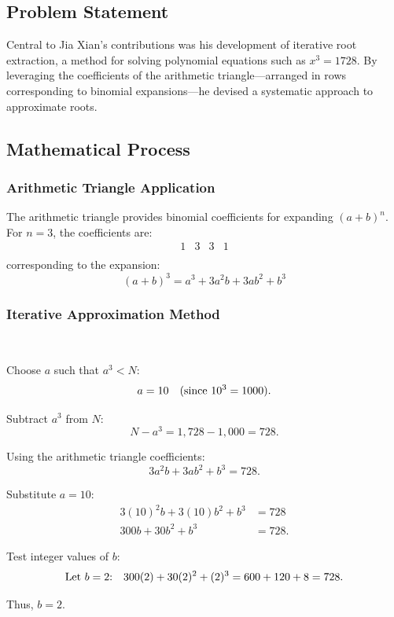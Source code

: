 \documentclass{article}
\begin{document}
\subsection{Problem Statement}
Central to Jia Xian’s contributions was his development of iterative root extraction, a method for solving polynomial equations such as $x^3=1728$. By leveraging the coefficients of the arithmetic triangle—arranged in rows corresponding to binomial expansions—he devised a systematic approach to approximate roots.

\subsection{Mathematical Process}

\subsubsection{Arithmetic Triangle Application}

The arithmetic triangle provides binomial coefficients for expanding \( (a + b)^n \). For \( n = 3 \), the coefficients are:
\[
\begin{array}{cccc}
1 & 3 & 3 & 1 \\
\end{array}
\]
corresponding to the expansion:
\[
(a + b)^3 = a^3 + 3a^2b + 3ab^2 + b^3
\]

\subsubsection{Iterative Approximation Method}

~

Choose \( a \) such that \( a^3 < N \):
\[
a = 10 \quad \text{(since \( 10^3 = 1000 \))}.
\]

Subtract \( a^3 \) from \( N \):
\[
N - a^3 = 1,\!728 - 1,\!000 = 728.
\]

Using the arithmetic triangle coefficients:
\[
3a^2b + 3ab^2 + b^3 = 728.
\]

Substitute \( a = 10 \):
\begin{align*}
3(10)^2b + 3(10)b^2 + b^3 &= 728 \\
300b + 30b^2 + b^3 &= 728.
\end{align*}

Test integer values of \( b \):
\[
\text{Let \( b = 2 \):} \quad 300(2) + 30(2)^2 + (2)^3 = 600 + 120 + 8 = 728.
\]

Thus, \( b = 2 \).
\end{document}
